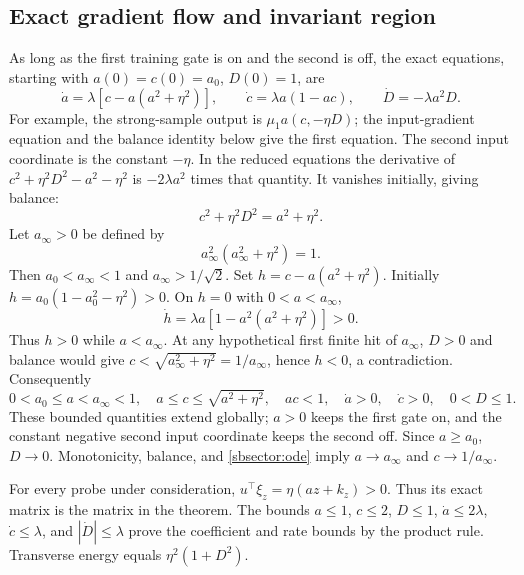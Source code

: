 \documentclass[10pt]{article}
\theoremstyle{remark}\newtheorem{remark}[theorem]{Remark}
\begin{document}
\subsection{Exact gradient flow and invariant region}
As long as the first training gate is on and the second is off,
the exact equations, starting with $a(0)=c(0)=a_0$, $D(0)=1$, are
\begin{equation}\label{sbsector:ode}
 \dot a=\lambda[c-a(a^2+\eta^2)],\qquad
 \dot c=\lambda a(1-ac),\qquad
 \dot D=-\lambda a^2D.
\end{equation}
For example, the strong-sample output is $\mu_1a(c,-\eta D)$;
the input-gradient equation and the balance identity below give the
first equation. The second input coordinate is the constant $-\eta$.
In the reduced equations the derivative of
$c^2+\eta^2D^2-a^2-\eta^2$ is $-2\lambda a^2$ times that quantity.
It vanishes initially, giving balance:
\begin{equation}\label{sbsector:balance}
 c^2+\eta^2D^2=a^2+\eta^2.
\end{equation}
Let $a_\infty>0$ be defined by
\[
 a_\infty^2(a_\infty^2+\eta^2)=1.
\]
Then $a_0<a_\infty<1$ and $a_\infty>1/\sqrt2$.
Set $h=c-a(a^2+\eta^2)$. Initially $h=a_0(1-a_0^2-\eta^2)>0$.
On $h=0$ with $0<a<a_\infty$,
\[
 \dot h=\lambda a[1-a^2(a^2+\eta^2)]>0.
\]
Thus $h>0$ while $a<a_\infty$. At any hypothetical first finite hit
of $a_\infty$, $D>0$ and balance would give
$c<\sqrt{a_\infty^2+\eta^2}=1/a_\infty$, hence $h<0$, a contradiction.
Consequently
\[
 0<a_0\le a<a_\infty<1,\quad
 a\le c\le\sqrt{a^2+\eta^2},\quad ac<1,\quad
 \dot a>0,\quad\dot c>0,\quad 0<D\le1.
\]
These bounded quantities extend globally; $a>0$ keeps the first gate on,
and the constant negative second input coordinate keeps the second off.
Since $a\ge a_0$, $D\to0$. Monotonicity, balance, and
\eqref{sbsector:ode} imply $a\to a_\infty$ and $c\to1/a_\infty$.

For every probe under consideration,
$u^\top\xi_z=\eta(az+k_z)>0$. Thus its exact matrix is the matrix in
the theorem. The bounds $a\le1$, $c\le2$, $D\le1$,
$\dot a\le2\lambda$, $\dot c\le\lambda$, and
$|\dot D|\le\lambda$ prove the coefficient and rate bounds by the
product rule. Transverse energy equals $\eta^2(1+D^2)$.
\end{document}
